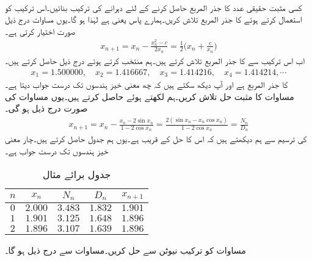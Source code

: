 \quad {}\\
کسی مثبت حقیقی عدد  کا جذر المربع حاصل کرنے کے لئے دہرانے کی ترکیب بنائیں۔اس ترکیب کو استعمال کرتے ہوئے  کا جذر المربع تلاش کریں۔ہمارے پاس   یعنی  ہے لہٰذا  ہو گا۔یوں مساوات  درج ذیل صورت اختیار کرتی ہے۔
\begin{align*}
x_{n+1}=x_n-\frac{x_n^2-c}{2x_n}=\frac{1}{2}\big(x_n+\frac{c}{x_n}\big)
\end{align*}
اب اس ترکیب سے  کا جذر المربع تلاش کرتے ہیں۔ہم  منتخب کرتے ہوئے درج ذیل حاصل کرتے ہیں۔
\begin{align*}
x_1=\num{1.500000},\quad x_2=\num{1.416667},\quad x_3=\num{1.414216},\quad x_4=\num{1.414214},\cdots
\end{align*}
 کا جذر المربع  ہے اور آپ دیکھ سکتے ہیں کہ  چھ معنی خیز ہندسوں تک درست جواب دیتا ہے۔
\quad {}\\
مساوات  کا مثبت حل تلاش کریں۔ہم  لکھتے ہوئے  حاصل کرتے ہیں۔یوں مساوات  کی صورت درج ذیل ہو گی۔
\begin{align*}
x_{n+1}=x_n-\frac{x_n-2\sin x_n}{1-2\cos x_n}=\frac{2(\sin x_n-x_n\cos x_n)}{1-2\cos x_n}=\frac{N_n}{D_n}
\end{align*}
 کی ترسیم سے ہم دیکھتے ہیں کہ اس کا حل  کے قریب ہے۔یوں ہم جدول  حاصل کرتے ہیں۔چار معنی خیز ہندسوں تک درست جواب  ہے۔
\begin{table}
\caption{جدول برائے مثال }
\label{جدول_مثال_اعدادی_ماورائی_الف}
\centering
\begin{tabular}{c|cccc}
$n$& $x_n$& $N_n$ &$D_n$  & $x_{n+1}$\\
\hline
$0$& $2.000$& $3.483$ & $1.832$ & $1.901$\\
$1$& $1.901$ & $3.125$ & $1.648$ & $1.896$\\
$2$& $1.896$ & $3.107$ & $1.639$ & $1.896$
\end{tabular}
\end{table}
\quad {}
مساوات  کو ترکیب نیوٹن سے حل کریں۔مساوات  سے درج ذیل ہو گا۔
